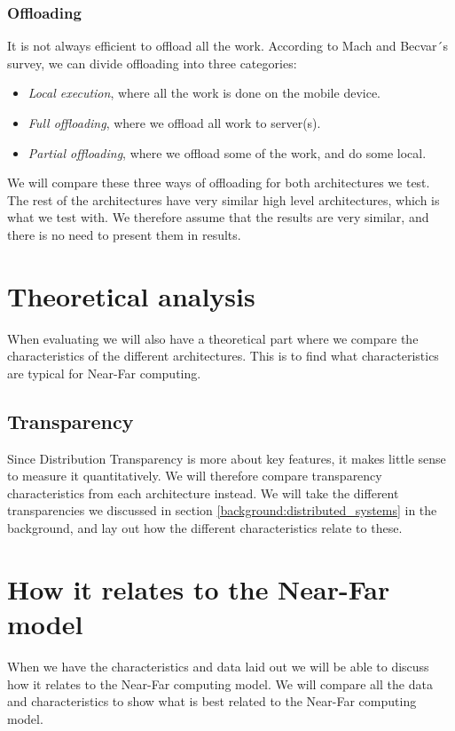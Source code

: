 \subsubsection{Offloading}
It is not always efficient to offload all the work. According to Mach and Becvar´s survey\cite{mach_mobile_2017}, we can divide offloading into three categories:
\begin{itemize}
    \item \textit{Local execution}, where all the work is done on the mobile device.
    \item \textit{Full offloading}, where we offload all work to server(s).
    \item \textit{Partial offloading}, where we offload some of the work, and do some local.
\end{itemize}
We will compare these three ways of offloading for both architectures we test.
The rest of the architectures have very similar high level architectures, which is what we test with. We therefore assume that the results are very similar, and there is no need to present them in results.


\section{Theoretical analysis}
When evaluating we will also have a theoretical part where we compare the characteristics of the different architectures. This is to find what characteristics are typical for Near-Far computing.

\subsection{Transparency}
Since Distribution Transparency is more about key features, it makes little sense to measure it quantitatively. We will therefore compare transparency characteristics from each architecture instead. We will take the different transparencies we discussed in section \ref{background:distributed_systems} in the background, and lay out how the different characteristics relate to these.




\section{How it relates to the Near-Far model}
When we have the characteristics and data laid out we will be able to discuss how it relates to the Near-Far computing model. We will compare all the data and characteristics to show what is best related to the Near-Far computing model.










